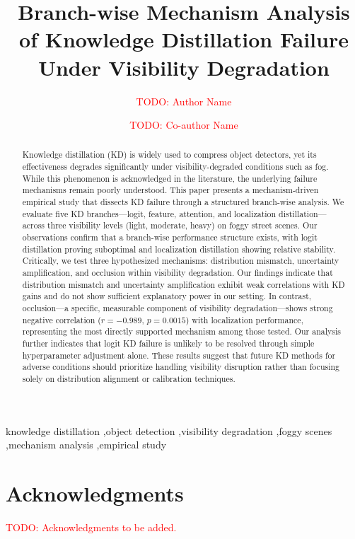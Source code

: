 \documentclass[preprint,12pt]{elsarticle}
\begin{document}
\begin{frontmatter}

\title{Branch-wise Mechanism Analysis of Knowledge Distillation Failure Under Visibility Degradation}

\author[1]{\textcolor{red}{TODO: Author Name}}

\author[1]{\textcolor{red}{TODO: Co-author Name}}

\address[1]{\textcolor{red}{TODO: Department, University, Address}}

\begin{abstract}
Knowledge distillation (KD) is widely used to compress object detectors, yet its effectiveness degrades significantly under visibility-degraded conditions such as fog. While this phenomenon is acknowledged in the literature, the underlying failure mechanisms remain poorly understood. This paper presents a mechanism-driven empirical study that dissects KD failure through a structured branch-wise analysis. We evaluate five KD branches---logit, feature, attention, and localization distillation---across three visibility levels (light, moderate, heavy) on foggy street scenes. Our observations confirm that a branch-wise performance structure exists, with logit distillation proving suboptimal and localization distillation showing relative stability. Critically, we test three hypothesized mechanisms: distribution mismatch, uncertainty amplification, and occlusion within visibility degradation. Our findings indicate that distribution mismatch and uncertainty amplification exhibit weak correlations with KD gains and do not show sufficient explanatory power in our setting. In contrast, occlusion---a specific, measurable component of visibility degradation---shows strong negative correlation ($r=-0.989$, $p=0.0015$) with localization performance, representing the most directly supported mechanism among those tested. Our analysis further indicates that logit KD failure is unlikely to be resolved through simple hyperparameter adjustment alone. These results suggest that future KD methods for adverse conditions should prioritize handling visibility disruption rather than focusing solely on distribution alignment or calibration techniques.
\end{abstract}

\begin{keyword}
knowledge distillation \sep object detection \sep visibility degradation \sep foggy scenes \sep mechanism analysis \sep empirical study
\end{keyword}

\end{frontmatter}









\section*{Acknowledgments}
\textcolor{red}{TODO: Acknowledgments to be added.}



\end{document}
